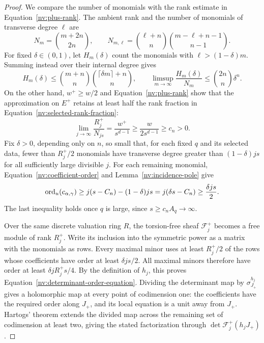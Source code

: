 \begin{proof}
We compare the number of monomials with the rank estimate in
Equation~\eqref{nv:plus-rank}.  The
ambient rank and the number of monomials of transverse degree \(\ell\)
are
\[
 N_m=\binom{m+2n}{2n},\qquad
 N_{m,\ell}=\binom{\ell+n}{n}
             \binom{m-\ell+n-1}{n-1}.
\]
For fixed \(\delta\in(0,1)\), let \(H_m(\delta)\) count the monomials
with \(\ell>(1-\delta)m\).  Summing instead over their internal
degree gives
\[
 H_m(\delta)
 \le \binom{m+n}{n}\binom{\lceil\delta m\rceil+n}{n},\qquad
 \limsup_{m\to\infty}\frac{H_m(\delta)}{N_m}
       \le\binom{2n}{n}\delta^n.
\]
On the other hand, \(w^+\ge w/2\) and
Equation~\eqref{nv:plus-rank} show that the approximation on \(E^+\)
retains at least half the rank fraction in
Equation~\eqref{nv:selected-rank-fraction}:
\[
 \lim_{j\to\infty}\frac{R_j^+}{N_{js}}
       =\frac{w^+}{s^{d-1}}
       \ge\frac{w}{2s^{d-1}}\ge c_n>0.
\]
Fix \(\delta>0\), depending only on \(n\), so small that, for each fixed
\(q\) and its selected data, fewer than \(R_j^+/2\) monomials have transverse
degree greater than \((1-\delta)js\) for all sufficiently large divisible
\(j\).  For each
remaining monomial, Equation~\eqref{nv:coefficient-order} and
Lemma~\ref{nv:incidence-pole} give
\[
 \operatorname{ord}_u(c_{\alpha,\gamma})
   \ge j(s-C_n)-(1-\delta)js
   =j(\delta s-C_n)\ge\frac{\delta js}{2}.
\]
The last inequality holds once \(q\) is large, since
\(s\ge c_nA_q\to\infty\).

Over the same discrete valuation ring \(R\), the torsion-free sheaf
\(\mathcal F_j^+\) becomes a free module of rank \(R_j^+\).  Write its
inclusion into the symmetric power as a matrix with the monomials
as rows.  Every maximal minor uses at least \(R_j^+/2\) of the rows
whose coefficients have order at least \(\delta js/2\).  All maximal
minors therefore have order at least
\(\delta jR_j^+s/4\).  By the definition of \(h_j\), this proves
Equation~\eqref{nv:determinant-order-equation}.  Dividing the determinant
map by \(\sigma_{J_+}^{h_j}\) gives a holomorphic map at every point of
codimension one: the coefficients have the required order along \(J_+\),
and its local equation is a unit away from \(J_+\).  Hartogs' theorem
extends the divided map across the remaining set of codimension at least
two, giving the stated factorization through
\(\det\mathcal F_j^+(h_jJ_+)\).
\end{proof}

